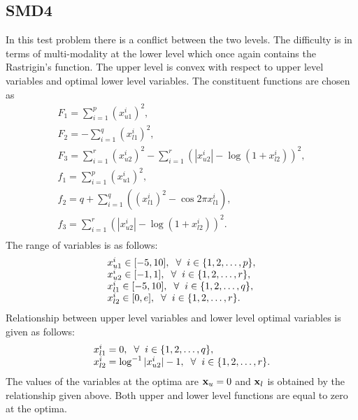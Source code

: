 \documentclass[twoside]{article}
\begin{document}
\subsection{SMD4}
In this test problem there is a conflict between the two levels. The difficulty is in terms of multi-modality at the lower level which once again contains the Rastrigin's function. The upper level is convex with respect to upper level variables and optimal lower level variables. The constituent functions are chosen as
\begin{equation}
\begin{array}{l}
F_1 = \sum_{i=1}^{p} (x_{u1}^{i})^2,\\
F_2 = - \sum_{i=1}^{q} (x_{l1}^{i})^2,\\
F_3 = \sum_{i=1}^{r} (x_{u2}^{i})^2 - \sum_{i=1}^{r} (|x_{u2}^{i}| - \log (1+x_{l2}^{i}))^2,\\
f_1 = \sum_{i=1}^{p} (x_{u1}^{i})^2,\\
f_2 = q + \sum_{i=1}^{q} \left(\left(x_{l1}^{i}\right)^2 - \cos 2\pi x_{l1}^{i}\right),\\
f_3 = \sum_{i=1}^{r} (|x_{u2}^{i}| - \log(1+x_{l2}^{i}))^2.\\
\end{array}
\end{equation}
The range of variables is as follows:
\begin{equation}
\begin{array}{l}
x_{u1}^{i} \in [-5,10], \hspace{2mm} \forall \hspace{2mm} i \in \{1,2,\ldots,p\},\\
x_{u2}^{i} \in [-1,1], \hspace{2mm} \forall \hspace{2mm} i \in \{1,2,\ldots,r\},\\
x_{l1}^{i} \in [-5,10], \hspace{2mm} \forall \hspace{2mm} i \in \{1,2,\ldots,q\},\\
x_{l2}^{i} \in [0,e], \hspace{2mm} \forall \hspace{2mm} i \in \{1,2,\ldots,r\}.
\end{array}
\end{equation}
Relationship between upper level variables and lower level optimal variables is given as follows:
\begin{equation}
\begin{array}{l}
x_{l1}^{i} = 0, \hspace{2mm} \forall \hspace{2mm} i \in \{1,2,\ldots,q\},\\
x_{l2}^{i} = \log^{-1} |x_{u2}^{i}| - 1, \hspace{2mm} \forall \hspace{2mm} i \in \{1,2,\ldots,r\}.
\end{array}
\end{equation}
The values of the variables at the optima are $\mbox{$\mathbf{x}$}_u=0$ and $\mbox{$\mathbf{x}$}_l$ is obtained by the relationship given above. Both upper and
lower level functions are equal to zero at the optima.
\end{document}
